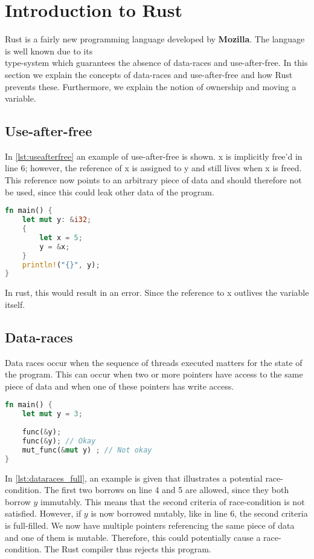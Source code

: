 \section{Introduction to Rust}\label{s:rust}
Rust is a fairly new programming language developed by \textbf{Mozilla}. The language is well known due to its\\ type-system which guarantees the absence of data-races and use-after-free. In this section we explain the concepts of data-races and use-after-free and how Rust prevents these. Furthermore, we explain the notion of ownership and moving a variable. 

\subsection{Use-after-free} 
In \autoref{lst:useafterfree} an example of use-after-free is shown. x is implicitly free'd in line 6; however, the reference of x is assigned to y and still lives when x is freed. This reference now points to an arbitrary piece of data and should therefore not be used, since this could leak other data of the program. 

 \begin{lstlisting}[language=rust, showstringspaces=false, escapechar=~, label={lst:useafterfree}, caption={Example of use-after-free}]
fn main() { 
    let mut y: &i32;
    {
        let x = 5;
        y = &x;
    }
    println!("{}", y); 
}

\end{lstlisting}
In rust, this would result in an error. Since the reference to x outlives the variable itself. 

\subsection{Data-races}
Data races occur when the sequence of threads executed matters for the state of the program. This can occur when two or more pointers have access to the same piece of data and when one of these pointers has write access. 

 \begin{lstlisting}[language=rust, showstringspaces=false, escapechar=~, label={lst:dataraces_full}, caption={Example of potential data-race}]
fn main() { 
    let mut y = 3;
    
    func(&y);
    func(&y); // Okay
    mut_func(&mut y) ; // Not okay 
}
\end{lstlisting}
In \autoref{lst:dataraces_full}, an example is given that illustrates a potential race-condition. The first two borrows on line 4 and 5 are allowed, since they both borrow $y$ immutably. This means that the second criteria of race-condition is not satisfied. However, if $y$ is now borrowed mutably, like in line 6, the second criteria is full-filled. We now have multiple pointers referencing the same piece of data and one of them is mutable. Therefore, this could potentially cause a race-condition. The Rust compiler thus rejects this program.\\

